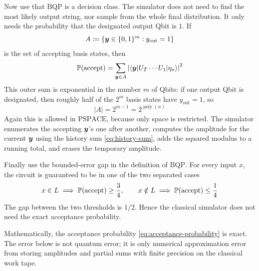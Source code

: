 Now use that \(\mathrm{BQP}\) is a decision class.
The simulator does not need to find the most likely output string, nor sample from the whole final distribution.
It only needs the probability that the designated output Qbit is \(1\).
If
\[
A
\coloneq
\left\{
{\boldsymbol{y}}\in\{0,1\}^{m}
:
y_{\mathrm{out}}=1
\right\}
\]
is the set of accepting basis states, then
\begin{equation}\label{eq:acceptance-probability}
\operatorname{\mathbb{P}}(\text{accept})
=
\sum_{{\boldsymbol{y}}\in A}
\left|
\braket{{\boldsymbol{y}}|U_T\cdots U_1|\eta_x}
\right|^2
\end{equation}
This outer sum is exponential in the number \(m\) of Qbits:
if one output Qbit is designated, then roughly half of the \(2^m\) basis states have \(y_{\mathrm{out}}=1\), so
\[
|A|
=
2^{m-1}
=
2^{\operatorname{poly}(n)} 
\]
Again this is allowed in \(\mathrm{PSPACE}\), because only space is restricted.
The simulator enumerates the accepting \({\boldsymbol{y}}\)'s one after another, 
computes the amplitude for the current \({\boldsymbol{y}}\) using the history sum \eqref{eq:history-sum}, 
adds the squared modulus to a running total, and erases the temporary amplitude.

Finally use the bounded-error gap in the definition of \(\mathrm{BQP}\).
For every input \(x\), the circuit is guaranteed to be in one of the two separated cases
\[
x\in L
\implies
\operatorname{\mathbb{P}}(\text{accept})\ge \frac34,
\qquad
x\notin L
\implies
\operatorname{\mathbb{P}}(\text{accept})\le \frac14
\]
The gap between the two thresholds is \(1/2\).
Hence the classical simulator does not need the exact acceptance probability.

\begin{remark}
Mathematically, the acceptance probability \eqref{eq:acceptance-probability} is exact.
The error below is not quantum error; it is only numerical approximation error from storing amplitudes and partial sums with finite precision on the classical work tape.
\end{remark}

